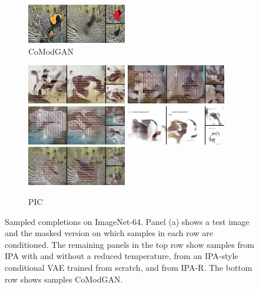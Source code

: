 \begin{figure}[t]
\begin{subfigure}[t]{0.2\textwidth}
      \includegraphics[height=\imagenetimgheight]{figs/cigcvae/image-samples/imagenet64/freeform_co_mod_gan_4_samples.png}
      \caption{CoModGAN}
    \end{subfigure}
    \begin{subfigure}[t]{0.2\textwidth}
      \centering
      \includegraphics[height=\imagenetimgheight]{figs/cigcvae/image-samples/imagenet64/freeform_pic_0_samples.png}
      \includegraphics[height=\imagenetimgheight]{figs/cigcvae/image-samples/imagenet64/freeform_pic_1_samples.png}
      \includegraphics[height=\imagenetimgheight]{figs/cigcvae/image-samples/imagenet64/freeform_pic_2_samples.png}
      \includegraphics[height=\imagenetimgheight]{figs/cigcvae/image-samples/imagenet64/freeform_pic_3_samples.png}
      \includegraphics[height=\imagenetimgheight]{figs/cigcvae/image-samples/imagenet64/freeform_pic_4_samples.png}
      \caption{PIC}
    \end{subfigure}
    \begin{subfigure}[t]{0.4\textwidth}
      \setlength{\fboxrule}{0pt}
      \fbox{
        \begin{minipage}{5cm}
          \hfill\hspace{5cm}
        \end{minipage}
      }
    \end{subfigure}
    \caption{Sampled completions on ImageNet-64. Panel (a) shows a test image
      and the masked version on which samples in each row are conditioned. The
      remaining panels in the top row show samples from IPA with and without a
      reduced temperature, from an IPA-style conditional VAE trained from
      scratch, and from IPA-R. The bottom row shows samples CoModGAN.}
    \vspace{-.5cm}
    \label{fig:cigcvae-imagenet-samples}
  \end{figure}


